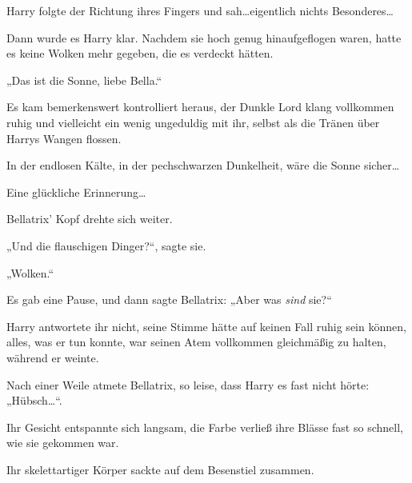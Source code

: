 Harry folgte der Richtung ihres Fingers und sah…eigentlich nichts Besonderes…

Dann wurde es Harry klar. Nachdem sie hoch genug hinaufgeflogen waren, hatte es keine Wolken mehr gegeben, die es verdeckt hätten.

„Das ist die Sonne, liebe Bella.“

Es kam bemerkenswert kontrolliert heraus, der Dunkle Lord klang vollkommen ruhig und vielleicht ein wenig ungeduldig mit ihr, selbst als die Tränen über Harrys Wangen flossen.

In der endlosen Kälte, in der pechschwarzen Dunkelheit, wäre die Sonne sicher…

Eine glückliche Erinnerung…

Bellatrix’ Kopf drehte sich weiter.

„Und die flauschigen Dinger?“, sagte sie.

„Wolken.“

Es gab eine Pause, und dann sagte Bellatrix: „Aber was \emph{sind} sie?“

Harry antwortete ihr nicht, seine Stimme hätte auf keinen Fall ruhig sein können, alles, was er tun konnte, war seinen Atem vollkommen gleichmäßig zu halten, während er weinte.

Nach einer Weile atmete Bellatrix, so leise, dass Harry es fast nicht hörte: „Hübsch…“.

Ihr Gesicht entspannte sich langsam, die Farbe verließ ihre Blässe fast so schnell, wie sie gekommen war.

Ihr skelettartiger Körper sackte auf dem Besenstiel zusammen.

